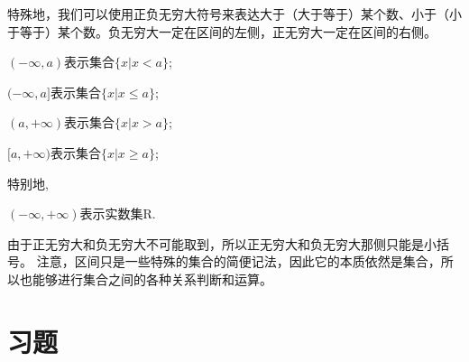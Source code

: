 特殊地，我们可以使用正负无穷大符号来表达大于（大于等于）某个数、小于（小于等于）某个数。负无穷大一定在区间的左侧，正无穷大一定在区间的右侧。
\begin{definition}
    $(-\infty,a)$表示集合$\{x | x < a\}$;

    $(-\infty,a]$表示集合$\{x | x \leq a\}$;
    
    $(a,+\infty)$表示集合$\{x | x > a\}$;
    
    $[a,+\infty)$表示集合$\{x | x \geq a\}$;
    
    特别地,
    
    $(-\infty,+\infty)$表示实数集R.
\end{definition}
由于正无穷大和负无穷大不可能取到，所以正无穷大和负无穷大那侧只能是小括号。
注意，区间只是一些特殊的集合的简便记法，因此它的本质依然是集合，所以也能够进行集合之间的各种关系判断和运算。

\section*{习题 \thesection}